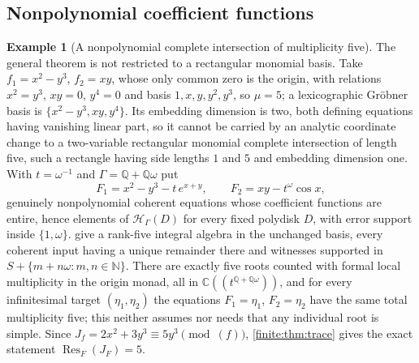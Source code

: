 \documentclass[11pt,letterpaper]{article}
\theoremstyle{definition}
\newtheorem{example}[theorem]{Example}
\theoremstyle{remark}
\newcommand{\C}{\mathbb C}
\newcommand{\N}{\mathbb N}
\newcommand{\Q}{\mathbb Q}
\newcommand{\HH}{\mathscr H}
\DeclareMathOperator{\Res}{Res}
\numberwithin{equation}{section}
\begin{document}
\subsection{Nonpolynomial coefficient functions}
\label{finite:sec:nonpoly}

\begin{example}[A nonpolynomial complete intersection of multiplicity five]
\label{finite:ex:five}
The general theorem is not restricted to a rectangular monomial basis. Take $f_1=x^2-y^3$, $f_2=xy$, whose only common zero is the origin, with relations $x^2=y^3$, $xy=0$, $y^4=0$ and basis $1,x,y,y^2,y^3$, so $\mu=5$; a lexicographic Gr\"obner basis is $\{x^2-y^3,xy,y^4\}$. Its embedding dimension is two, both defining equations having vanishing linear part, so it cannot be carried by an analytic coordinate change to a two-variable rectangular monomial complete intersection of length five, such a rectangle having side lengths $1$ and $5$ and embedding dimension one. With $t=\omega^{-1}$ and $\Gamma=\Q+\Q\omega$ put
\[
 F_1=x^2-y^3-t\,e^{x+y},
 \qquad
 F_2=xy-t^\omega\cos x,
\]
genuinely nonpolynomial coherent equations whose coefficient functions are entire, hence elements of $\HH_\Gamma(D)$ for every fixed polydisk $D$, with error support inside $\{1,\omega\}$.  give a rank-five integral algebra in the unchanged basis, every coherent input having a unique remainder there and witnesses supported in $S+\{m+n\omega:m,n\in\N\}$. There are exactly five roots counted with formal local multiplicity in the origin monad, all in $\C((t^{\Q+\Q\omega}))$, and for every infinitesimal target $(\eta_1,\eta_2)$ the equations $F_1=\eta_1$, $F_2=\eta_2$ have the same total multiplicity five; this neither assumes nor needs that any individual root is simple. Since $J_f=2x^2+3y^3\equiv5y^3\pmod{(f)}$, \cref{finite:thm:trace} gives the exact statement $\Res_F(J_F)=5$.
\end{example}
\end{document}
